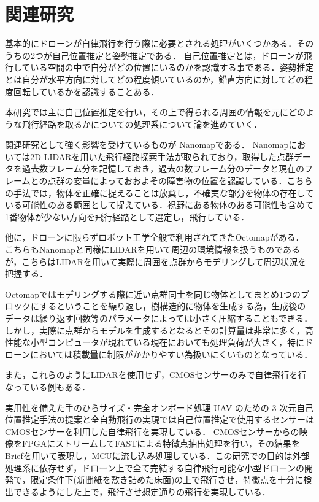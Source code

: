 \section{関連研究}
基本的にドローンが自律飛行を行う際に必要とされる処理がいくつかある．そのうちの2つが自己位置推定と姿勢推定である．
自己位置推定とは，ドローンが飛行している空間の中で自分がどの位置にいるのかを認識する事である．姿勢推定とは自分が水平方向に対してどの程度傾いているのか，鉛直方向に対してどの程度回転しているかを認識することある．

本研究では主に自己位置推定を行い，その上で得られる周囲の情報を元にどのような飛行経路を取るかについての処理系について論を進めていく．

関連研究として強く影響を受けているものが Nanomap\cite{Nanomap}である．
Nanomapにおいては2D-LIDARを用いた飛行経路探索手法が取られており，取得した点群データを過去数フレーム分を記憶しておき，過去の数フレーム分のデータと現在のフレームとの点群の変量によっておおよその障害物の位置を認識している．こちらの手法では，物体を正確に捉えることは放棄し，不確実な部分を物体の存在している可能性のある範囲として捉えている．視野にある物体のある可能性も含めて1番物体が少ない方向を飛行経路として選定し，飛行している．

他に，ドローンに限らずロボット工学全般で利用されてきたOctomap\cite{Octomap}がある．
こちらもNanomapと同様にLIDARを用いて周辺の環境情報を扱うものであるが，こちらはLIDARを用いて実際に周囲を点群からモデリングして周辺状況を把握する．

Octomapではモデリングする際に近い点群同士を同じ物体としてまとめ1つのブロックにするということを繰り返し，樹構造的に物体を生成する為，生成後のデータは繰り返す回数等のパラメータによっては小さく圧縮することもできる．
しかし，実際に点群からモデルを生成するとなるとその計算量は非常に多く，高性能な小型コンピュータが現れている現在においても処理負荷が大きく，特にドローンにおいては積載量に制限がかかりやすい為扱いにくいものとなっている．

また，これらのようにLIDARを使用せず，CMOSセンサーのみで自律飛行を行なっている例もある．

実用性を備えた手のひらサイズ・完全オンボード処理 UAV のための 3 次元自己位置推定手法の提案と全自動飛行の実現\cite{SfMDrone}では自己位置推定で使用するセンサーはCMOSセンサーを利用した自律飛行を実現している．
CMOSセンサーからの映像をFPGAにストリームしてFAST\cite{FAST}による特徴点抽出処理を行い，その結果をBrief\cite{Brief}を用いて表現し，MCUに流し込み処理している．この研究での目的は外部処理系に依存せず，ドローン上で全て完結する自律飛行可能な小型ドローンの開発で，限定条件下(新聞紙を敷き詰めた床面)の上で飛行させ，特徴点を十分に検出できるようにした上で，飛行させ想定通りの飛行を実現している．

